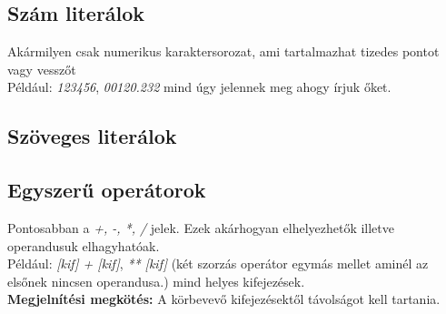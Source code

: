 \documentclass{article}[12pt,a4paper]
\newcommand{\lang}[1]{\textit{#1}}
\begin{document}
    \subsection{Szám literálok}\label{subsec:szám-literálok}
    Akármilyen csak numerikus karaktersorozat, ami tartalmazhat tizedes pontot vagy vesszőt\\
    Például: \lang{123456}, \lang{00120.232} mind úgy jelennek meg ahogy írjuk őket.
    
    \subsection{Szöveges literálok}\label{subsec:szöveges-literálok}


    \subsection{Egyszerű operátorok}\label{subsec:két-operandusu-egyszerű-operátorok}
    Pontosabban a \textit{+, -, *, /} jelek.
    Ezek akárhogyan elhelyezhetők illetve operandusuk elhagyhatóak. \\
    Például: \lang{[kif] + [kif]}, \lang{** [kif]} (két szorzás operátor egymás mellet aminél az elsőnek nincsen operandusa.) mind helyes kifejezések. \\
    \textbf{Megjelnítési megkötés:} A körbevevő kifejezésektől távolságot kell tartania.

    \subsection{}
    
\end{document}
